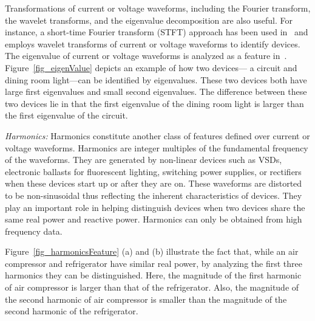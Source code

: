 Transformations of 
current or voltage waveforms, including the Fourier transform, 
 the wavelet transforms, 
and the eigenvalue decomposition are also useful. 
For instance, a short-time Fourier transform (STFT) approach has been used 
in~\cite{su2011feature} and 
\cite{chan2000harmonics} employs wavelet transforms of current 
or voltage waveforms 
to identify devices. 
The eigenvalue of current or voltage waveforms is analyzed
as a feature in~\cite{liang2010load}. 
Figure~\ref{fig_eigenValue} depicts an example of how
two devices--- a circuit and dining room light---can be 
identified by eigenvalues.
These two devices both
have large first eigenvalues and small second eigenvalues. 
The difference between these two devices lie in that 
the first eigenvalue of the dining room light is larger than the first 
eigenvalue of the circuit. 


\textit{Harmonics:}
Harmonics constitute another class of features
defined over current or voltage waveforms.
Harmonics are integer multiples of the fundamental frequency of the waveforms. 
They are generated by non-linear devices such as VSDs,
electronic ballasts for fluorescent lighting,
switching power supplies, or rectifiers
when these devices start up or after they are on.
These waveforms are distorted to
be non-sinusoidal thus reflecting the inherent characteristics
of devices.
They play an important role in helping distinguish devices
when two devices share the same real power and reactive power. 
Harmonics can only be obtained from high frequency 
 data. 

Figure~\ref{fig_harmonicsFeature} (a) and (b) illustrate the fact that, 
while an air compressor and refrigerator have similar real power,
by analyzing the first three harmonics
they can be distinguished.
Here, the magnitude of the first harmonic of air compressor is larger than 
that of the refrigerator. 
Also, the magnitude of the second harmonic of air compressor is smaller than 
the magnitude of the second harmonic of the refrigerator. 


